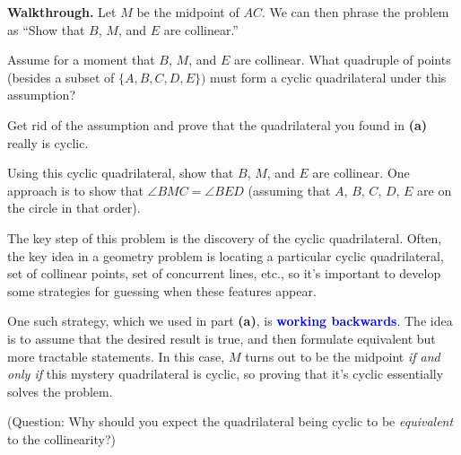 \documentclass{scrartcl}
\providecommand{\ii}{\item}
\providecommand{\alert}[1]{{\sffamily\textbf{\textcolor{blue}{#1}}}}
\newenvironment{walkthrough}{\noindent\textbf{Walkthrough.}}{}
\begin{document}
\begin{walkthrough}
	Let $M$ be the midpoint of $AC$. We can then phrase the problem as
	``Show that $B$, $M$, and $E$ are collinear.''
	\begin{walk}
		\ii Assume for a moment that $B$, $M$, and $E$ are collinear.
		What quadruple of points (besides a subset of $\{A, B, C, D, E\})$
		must form a cyclic quadrilateral under this assumption?
		
		\ii Get rid of the assumption and prove that the quadrilateral
		you found in \textbf{(a)} really is cyclic.
		
		\ii Using this cyclic quadrilateral, show that $B$, $M$, and $E$
		are collinear. One approach is to show that $\angle BMC = \angle BED$
		(assuming that $A$, $B$, $C$, $D$, $E$ are on the circle in that order).
	\end{walk}
	
	The key step of this problem is the discovery of the cyclic quadrilateral.
	Often, the key idea in a geometry problem is locating a particular
	cyclic quadrilateral, set of collinear points, set of concurrent lines,
	etc., so it's important to develop some strategies for guessing
	when these features appear.
	
	One such strategy, which we used in part \textbf{(a)}, is
	\alert{working backwards}. The idea is to assume that the desired result
	is true, and then formulate equivalent but more tractable statements.
	In this case, $M$ turns out to be the midpoint \emph{if and only if}
	this mystery quadrilateral is cyclic, so proving that it's cyclic
	essentially solves the problem.
	
	(Question: Why should you expect the quadrilateral being cyclic to be
	\emph{equivalent} to the collinearity?)
\end{walkthrough}
\end{document}
